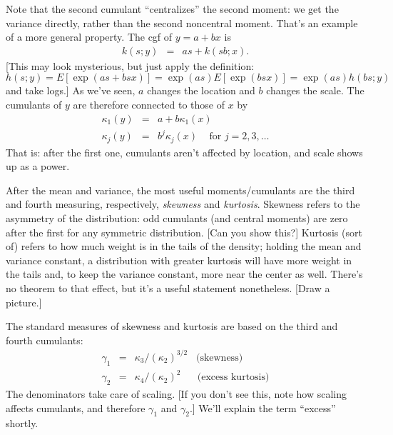 \documentclass[11pt]{article}
\begin{document}
Note that the second cumulant ``centralizes'' the second moment:
we get the variance directly, rather than the second noncentral moment.
That's an example of a more general property.
The cgf of $y = a+bx$ is
\begin{eqnarray*}
    k(s; y) &=& a s + k(sb; x) .
\end{eqnarray*}
[This may look mysterious, but just apply the definition:
$ h(s; y) = E[\exp(a s + bs x)] = \exp(as) E[\exp(bs x)] = \exp(as) h(bs; y)$ and take logs.]
As we've seen, $a$ changes the location and $b$ changes the scale.
The cumulants of $y$ are therefore connected to those of $x$ by
\begin{eqnarray*}
    \kappa_1 (y) &=& a + b \kappa_1 (x) \\
    \kappa_j (y) &=& b^j \kappa_j (x) \;\;\; \mbox{ for } j=2,3,\ldots
\end{eqnarray*}
That is:  after the first one, cumulants aren't affected by location,
and scale shows up as a power.

After the mean and variance, the most useful moments/cumulants
are the third and fourth measuring, respectively,
{\it skewness\/} and {\it kurtosis\/}.
Skewness refers to the asymmetry of the distribution:
odd cumulants (and central moments) are zero after the first
for any symmetric distribution.
[Can you show this?]
Kurtosis (sort of) refers to how much weight is in the tails of the density;
holding the mean and variance constant, a distribution
with greater kurtosis will have more weight in the tails and,
to keep the variance constant, more near the center as well.
There's no theorem to that effect, but it's a useful statement nonetheless.
[Draw a picture.]

The standard measures of skewness and kurtosis
are based on the third and fourth cumulants:
\begin{eqnarray*}
    \gamma_1 &=& \kappa_3 /(\kappa_2)^{3/2} \;\;\; \mbox{(skewness)}\\
    \gamma_2 &=& \kappa_4 /(\kappa_2)^2 \;\;\;\;\;\; \mbox{(excess kurtosis)}
\end{eqnarray*}
The denominators take care of scaling.
[If you don't see this, note how scaling affects cumulants,
and therefore $\gamma_1$ and $\gamma_2$.]
We'll explain the term ``excess'' shortly.

\end{document}
